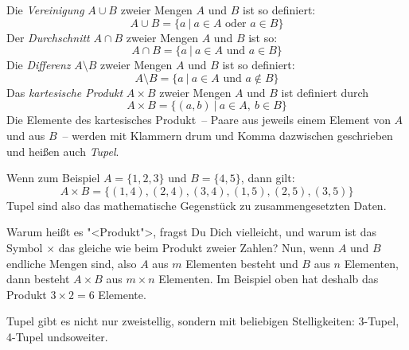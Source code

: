 Die \emph{Vereinigung} $A \cup B$ 
zweier Mengen $A$ und $B$ ist so definiert:
\[A \cup B  = \{a\ |\ a \in A \text{ oder } a \in B\}\]
%
Der \emph{Durchschnitt} $A \cap B$ 
zweier Mengen $A$ und $B$ ist so: 
\[A \cap B = \{a\ |\ a \in A \text{ und } a \in B\}\]
%
Die \emph{Differenz} $A \setminus B$ 
zweier Mengen $A$ und $B$ ist so definiert:
\[A \setminus B = \{a\ |\ a \in A \text{ und } a \not \in B\}\]
%
Das \emph{kartesische Produkt} 
  $A \times B$ zweier Mengen 
$A$ und $B$ ist definiert durch
\[ A \times B = \{(a,b)\ |\ a \in A,\ b \in B\}\]
%
Die Elemente des kartesisches Produkt~-- Paare aus jeweils einem
Element von $A$ und aus $B$~-- werden mit Klammern drum und Komma
dazwischen geschrieben und heißen auch
\textit{Tupel}.

Wenn zum Beispiel $A = \{1,2,3\}$ und $B = \{4,5\}$, dann gilt:
\begin{displaymath}
  A\times B = \{ (1,4), (2,4), (3,4), (1,5), (2,5), (3,5) \}
\end{displaymath}
%
Tupel sind also das mathematische Gegenstück zu zusammengesetzten Daten.

Warum heißt es "<Produkt">, fragst Du Dich vielleicht, und warum ist
das Symbol $\times$ das gleiche wie beim Produkt zweier Zahlen? Nun,
wenn $A$ und $B$ endliche Mengen sind, also $A$ aus $m$ Elementen besteht
und $B$ aus $n$ Elementen, dann besteht $A\times B$ aus $m\times n$ Elementen.  Im
Beispiel oben hat deshalb das Produkt $3\times 2=6$ Elemente.

Tupel gibt es nicht nur zweistellig, sondern mit beliebigen
Stelligkeiten: 3-Tupel, 4-Tupel undsoweiter.



